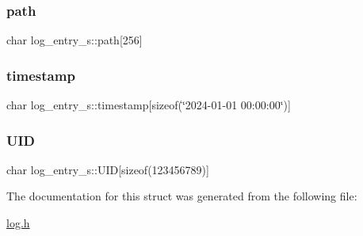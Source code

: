 \subsubsection{\texorpdfstring{path}{path}}
{\footnotesize\ttfamily char log\+\_\+entry\+\_\+s\+::path\mbox{[}256\mbox{]}}

\mbox{\label{structlog__entry__s_ac18d2273a9bf57e659d829e5fff27d70_ac18d2273a9bf57e659d829e5fff27d70}} 
\subsubsection{\texorpdfstring{timestamp}{timestamp}}
{\footnotesize\ttfamily char log\+\_\+entry\+\_\+s\+::timestamp\mbox{[}sizeof(\char`\"{}2024-\/01-\/01 00\+:00\+:00\char`\"{})\mbox{]}}

\mbox{\label{structlog__entry__s_a4cea55f12c34aebb7b3a0a8720e883bf_a4cea55f12c34aebb7b3a0a8720e883bf}} 
\subsubsection{\texorpdfstring{U\+ID}{UID}}
{\footnotesize\ttfamily char log\+\_\+entry\+\_\+s\+::\+U\+ID\mbox{[}sizeof(123456789)\mbox{]}}



The documentation for this struct was generated from the following file\+:\begin{DoxyCompactItemize}
\item 
\hyperlink{log_8h}{log.\+h}\end{DoxyCompactItemize}
